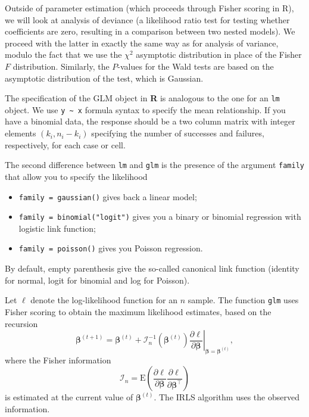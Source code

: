 \documentclass[]{book}
\providecommand{\tightlist}{%
  \setlength{\itemsep}{0pt}\setlength{\parskip}{0pt}}
\theoremstyle{definition}
\theoremstyle{definition}
\theoremstyle{definition}
\theoremstyle{remark}
\begin{document}
Outside of parameter estimation (which proceeds through Fisher scoring in R), we will look at analysis of deviance (a likelihood ratio test for testing whether coefficients are zero, resulting in a comparison between two nested models). We proceed with the latter in exactly the same way as for analysis of variance, modulo the fact that we use the \(\chi^2\) asymptotic distribution in place of the Fisher \(F\) distribution. Similarly, the \(P\)-values for the Wald tests are based on the asymptotic distribution of the test, which is Gaussian.

The specification of the GLM object in \textbf{R} is analogous to the one for an \texttt{lm} object.
We use \texttt{y\ \textasciitilde{}\ x} formula syntax to specify the mean relationship. If you have a binomial data, the response should be a two column matrix with integer elements \((k_i, n_i-k_i)\) specifying the number of successes and failures, respectively, for each case or cell.

The second difference between \texttt{lm} and \texttt{glm} is the presence of the argument \texttt{family} that allow you to specify the likelihood

\begin{itemize}
\tightlist
\item
  \texttt{family\ =\ gaussian()} gives back a linear model;
\item
  \texttt{family\ =\ binomial("logit")} gives you a binary or binomial regression with logistic link function;
\item
  \texttt{family\ =\ poisson()} gives you Poisson regression.
\end{itemize}

By default, empty parenthesis give the so-called canonical link function (identity for normal, logit for binomial and log for Poisson).

Let \(\ell\) denote the log-likelihood function for an \(n\) sample. The function \texttt{glm} uses Fisher scoring to obtain the maximum likelihood estimates, based on the recursion
\[ \boldsymbol{\beta}^{(t+1)} = \boldsymbol{\beta}^{(t)} + \mathcal{I}^{-1}_n(\boldsymbol{\beta}^{(t)}) \left. \frac{\partial \ell}{\partial \boldsymbol{\beta}} \right|_{\boldsymbol{\beta}=\boldsymbol{\beta}^{(t)} },\]
where the Fisher information
\[\mathcal{I}_n =\mathrm{E}\left(  \frac{\partial \ell}{\partial \boldsymbol{\beta}}\frac{\partial \ell}{\partial \boldsymbol{\beta}^\top}\right)\]
is estimated at the current value of \(\boldsymbol{\beta}^{(t)}\). The IRLS algorithm uses the observed information.
\end{document}
